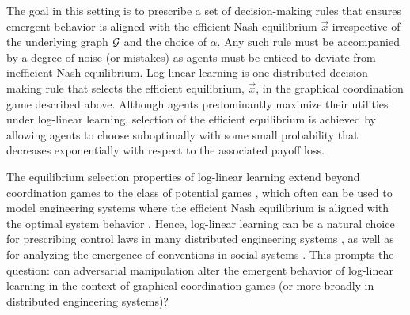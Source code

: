 The goal in this setting is to prescribe a set of decision-making rules that ensures emergent behavior is aligned with the efficient Nash equilibrium $\vec{x}$ irrespective of the underlying graph ${\cal G}$ and the choice of $\alpha$. Any such rule must be accompanied by a degree of noise (or mistakes) as agents must be enticed to deviate from inefficient Nash equilibrium.  
Log-linear learning \cite{Blume1993, Shah2010} is one distributed decision making rule that selects the efficient equilibrium, $\vec{x}$, in the graphical coordination game described above. Although agents predominantly maximize their utilities under log-linear learning, selection of the efficient equilibrium is achieved by allowing agents to choose suboptimally with some small probability that decreases exponentially with respect to the associated payoff loss. 

The equilibrium selection properties of log-linear learning extend beyond coordination games to the class of potential games \cite{Monderer1996}, which often can be used to model engineering systems where the efficient Nash equilibrium is aligned with the optimal system behavior \cite{Marden2007,Marden2008,Wolpert2001}.  Hence, log-linear learning can be a natural choice for prescribing control laws in many distributed engineering systems \cite{Marden2008,Zhu2009,Goto2010,Staudigl2012,Fox2010}, as well as for analyzing the emergence of conventions in social systems \cite{Young1993,Shah2010}.  This prompts the question: can adversarial manipulation  alter the emergent behavior of log-linear learning in the context of graphical coordination games (or more broadly in distributed engineering systems)?

